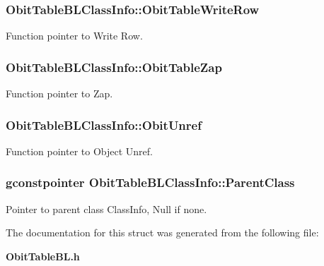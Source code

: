 \subsubsection{ {\bf Obit\-Table\-BLClass\-Info::Obit\-Table\-Write\-Row}}\label{structObitTableBLClassInfo_o26}


Function pointer to Write Row. 

\subsubsection{ {\bf Obit\-Table\-BLClass\-Info::Obit\-Table\-Zap}}\label{structObitTableBLClassInfo_o19}


Function pointer to Zap. 

\subsubsection{ {\bf Obit\-Table\-BLClass\-Info::Obit\-Unref}}\label{structObitTableBLClassInfo_o11}


Function pointer to Object Unref. 

\subsubsection{\setlength{\rightskip}{0pt plus 5cm}gconstpointer {\bf Obit\-Table\-BLClass\-Info::Parent\-Class}}\label{structObitTableBLClassInfo_o3}


Pointer to parent class Class\-Info, Null if none. 



The documentation for this struct was generated from the following file:\begin{CompactItemize}
\item 
{\bf Obit\-Table\-BL.h}\end{CompactItemize}
